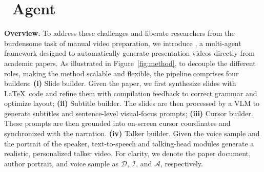 
\vspace{-0.5\baselineskip} 
\section{\agent~Agent}
\vspace{-0.6\baselineskip} 
\textbf{Overview.} 
To address these challenges and liberate researchers from the burdensome task of manual video preparation, we introduce {\agent}, a multi-agent framework designed to automatically generate presentation videos directly from academic papers. 
As illustrated in Figure~\ref{fig:method}, to decouple the different roles, making the method scalable and flexible, the pipeline comprises four builders:
\textbf{(i)} Slide builder. Given the paper, we first synthesize slides with \LaTeX~code and refine them with compilation feedback to correct grammar and optimize layout; 
\textbf{(ii)} Subtitle builder. The slides are then processed by a VLM to generate subtitles and sentence-level visual-focus prompts;  \textbf{(iii)} Cursor builder. These prompts are then grounded into on-screen cursor coordinates and synchronized with the narration.
\textbf{(iv)} Talker builder. Given the voice sample and the portrait of the speaker, text-to-speech and talking-head modules generate a realistic, personalized talker video. 
For clarity, we denote the paper document, author portrait, and voice sample as $\mathcal{D}$, $\mathcal{I}$, and $\mathcal{A}$, respectively.



